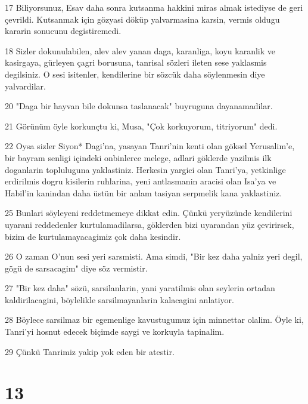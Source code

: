 \par 17 Biliyorsunuz, Esav daha sonra kutsanma hakkini miras almak istediyse de geri çevrildi. Kutsanmak için gözyasi döküp yalvarmasina karsin, vermis oldugu kararin sonucunu degistiremedi.
\par 18 Sizler dokunulabilen, alev alev yanan daga, karanliga, koyu karanlik ve kasirgaya, gürleyen çagri borusuna, tanrisal sözleri ileten sese yaklasmis degilsiniz. O sesi isitenler, kendilerine bir sözcük daha söylenmesin diye yalvardilar.
\par 20 "Daga bir hayvan bile dokunsa taslanacak" buyruguna dayanamadilar.
\par 21 Görünüm öyle korkunçtu ki, Musa, "Çok korkuyorum, titriyorum" dedi.
\par 22 Oysa sizler Siyon* Dagi'na, yasayan Tanri'nin kenti olan göksel Yerusalim'e, bir bayram senligi içindeki onbinlerce melege, adlari göklerde yazilmis ilk doganlarin topluluguna yaklastiniz. Herkesin yargici olan Tanri'ya, yetkinlige erdirilmis dogru kisilerin ruhlarina, yeni antlasmanin aracisi olan Isa'ya ve Habil'in kanindan daha üstün bir anlam tasiyan serpmelik kana yaklastiniz.
\par 25 Bunlari söyleyeni reddetmemeye dikkat edin. Çünkü yeryüzünde kendilerini uyarani reddedenler kurtulamadilarsa, göklerden bizi uyarandan yüz çevirirsek, bizim de kurtulamayacagimiz çok daha kesindir.
\par 26 O zaman O'nun sesi yeri sarsmisti. Ama simdi, "Bir kez daha yalniz yeri degil, gögü de sarsacagim" diye söz vermistir.
\par 27 "Bir kez daha" sözü, sarsilanlarin, yani yaratilmis olan seylerin ortadan kaldirilacagini, böylelikle sarsilmayanlarin kalacagini anlatiyor.
\par 28 Böylece sarsilmaz bir egemenlige kavustugumuz için minnettar olalim. Öyle ki, Tanri'yi hosnut edecek biçimde saygi ve korkuyla tapinalim.
\par 29 Çünkü Tanrimiz yakip yok eden bir atestir.

\chapter{13}


